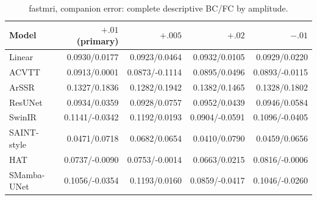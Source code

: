 \begin{table}[t]\centering\scriptsize

\caption{fastmri, companion error: complete descriptive BC/FC by amplitude.}

\begin{tabular}{lrrrr}\toprule Model & $+.01$ (primary) & $+.005$ & $+.02$ & $-.01$\\\midrule

Linear & 0.0930/0.0177 & 0.0923/0.0464 & 0.0932/0.0105 & 0.0929/0.0220\\

ACVTT & 0.0913/0.0001 & 0.0873/-0.1114 & 0.0895/0.0496 & 0.0893/-0.0115\\

ArSSR & 0.1327/0.1836 & 0.1282/0.1942 & 0.1382/0.1465 & 0.1328/0.1802\\

ResUNet & 0.0934/0.0359 & 0.0928/0.0757 & 0.0952/0.0439 & 0.0946/0.0584\\

SwinIR & 0.1141/-0.0342 & 0.1192/0.0193 & 0.0904/-0.0591 & 0.1096/-0.0405\\

SAINT-style & 0.0471/0.0718 & 0.0682/0.0654 & 0.0410/0.0790 & 0.0459/0.0656\\

HAT & 0.0737/-0.0090 & 0.0753/-0.0014 & 0.0663/0.0215 & 0.0816/-0.0006\\

SMamba-UNet & 0.1056/-0.0354 & 0.1193/0.0160 & 0.0859/-0.0417 & 0.1046/-0.0260\\

\bottomrule\end{tabular}\end{table}

